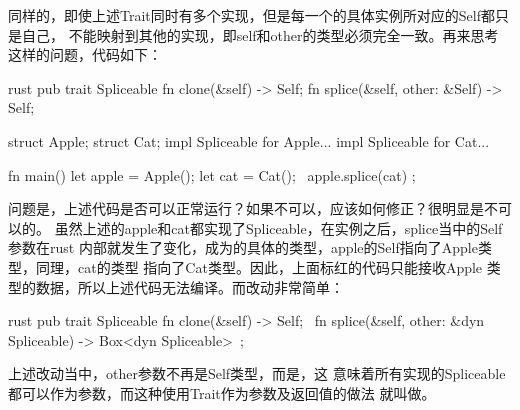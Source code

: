 同样的，即使上述Trait同时有多个实现，但是每一个的具体实例所对应的Self都只是自己，
不能映射到其他的实现，即self和other的类型必须完全一致。再来思考这样的问题，代码如下：
\begin{code-block}[escapeinside=~~,mathescape]{rust}
pub trait Spliceable {
    fn clone(&self) -> Self;
    fn splice(&self, other: &Self) -> Self;
}

struct Apple;
struct Cat;
impl Spliceable for Apple{...}
impl Spliceable for Cat{...}

fn main(){
    let apple = Apple();
    let cat = Cat();
    ~\colorbox{WildStrawberry}{apple.splice(cat) };~
}
\end{code-block}
问题是，上述代码是否可以正常运行？如果不可以，应该如何修正？很明显是不可以的。
虽然上述的apple和cat都实现了Spliceable，在实例之后，splice当中的Self参数在rust
内部就发生了变化，成为的具体的类型，apple的Self指向了Apple类型，同理，cat的类型
指向了Cat类型。因此，上面标红的代码只能接收Apple
类型的数据，所以上述代码无法编译。而改动非常简单：
\begin{code-block}[escapeinside=~~,mathescape]{rust}
pub trait Spliceable {
    fn clone(&self) -> Self;
    ~\colorbox{WildStrawberry}{fn splice(&self, other: &dyn Spliceable) -> Box<dyn Spliceable>}~;
}
\end{code-block}
上述改动当中，other参数不再是Self类型，而是，这
意味着所有实现的Spliceable都可以作为参数，而这种使用Trait作为参数及返回值的做法
就叫做。

